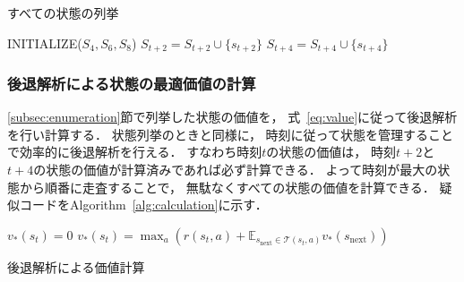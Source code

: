 \begin{algorithm}[tb]
\caption{すべての状態の列挙}
\label{alg:bfs}
\begin{algorithmic}[1]
    \State INITIALIZE($S_4, S_6, S_8$)
                    \State $S_{t+2} = S_{t+2} \cup \{s_{t+2}\}$
                \EndIf
            \EndFor
                    \State $S_{t+4} = S_{t+4} \cup \{s_{t+4}\}$
                \EndIf
            \EndFor
        \EndFor
    \EndFor
\EndFunction
\end{algorithmic}
\end{algorithm}

\subsubsection{後退解析による状態の最適価値の計算}
\label{subsec:calculation}
\ref{subsec:enumeration}節で列挙した状態の価値を， 式~\ref{eq:value}に従って後退解析を行い計算する．
状態列挙のときと同様に， 時刻に従って状態を管理することで効率的に後退解析を行える．
すなわち時刻$t$の状態の価値は， 時刻$t+2$と$t+4$の状態の価値が計算済みであれば必ず計算できる．
よって時刻が最大の状態から順番に走査することで， 無駄なくすべての状態の価値を計算できる．
疑似コードをAlgorithm~\ref{alg:calculation}に示す．
\begin{algorithm}[tb]
    \begin{algorithmic}[1]
                    \State $v_*(s_t) = 0$
                \Else {}
                    \State $v_*(s_t) = \max_a \left(r(s_t,a) + \mathbb{E}_{s_\text{next} \in \mathcal{T}(s_t,a)} v_*(s_\text{next}) \right)$
                \EndIf
            \EndFor
        \EndFor
    \EndFunction
    \end{algorithmic}
    \caption{後退解析による価値計算}
    \label{alg:calculation}
\end{algorithm}

